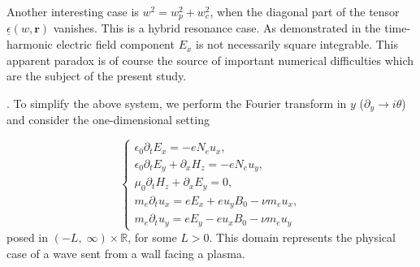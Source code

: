 {Another interesting case is $w^2=w_p^2+w_c^2$, when the diagonal part of the tensor $\underline{\epsilon}(w,\mathbf{r})$ vanishes. 
This is a hybrid resonance case. As demonstrated in  \cite{Despres_2014} the time-harmonic electric field component $E_x$ is not necessarily square 
integrable. This apparent paradox is of course the source of important numerical difficulties which are the subject of the present study.
}


.
To simplify the above system, we perform the Fourier transform in $y$ ($\partial_y\rightarrow i\theta$) and consider the one-dimensional setting

\begin{equation}
\label{eq:main_model}
\begin{cases}
\epsilon_0\partial_t E_{x}=-eN_e u_x,\\
\epsilon_0\partial_t E_{y}+\partial_x H_z=-eN_e u_y,\\
\mu_0\partial_t H_z+\partial_x E_y =0,\\
m_e\partial_t u_x=eE_x+eu_yB_0-\nu m_e u_x,\\
m_e\partial_t u_y=eE_y-eu_xB_0-\nu m_e u_y
\end{cases}
\end{equation}
posed in $(-L,\; \infty)\times \mathbb{R}$, for some $L>0$. This domain represents the physical case of a wave sent from a wall facing a plasma. 


